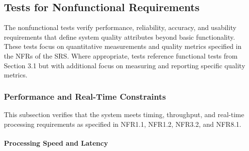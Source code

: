 \documentclass[12pt, titlepage]{article}
\begin{document}
\subsection{Tests for Nonfunctional Requirements}

The nonfunctional tests verify performance, reliability, accuracy, and
usability requirements that define system quality attributes beyond basic
functionality. These tests focus on quantitative measurements and quality
metrics specified in the NFRs of the SRS. Where appropriate, tests
reference functional tests from Section 3.1 but with additional focus on
measuring and reporting specific quality metrics.

\subsubsection{Performance and Real-Time Constraints}

This subsection verifies that the system meets timing, throughput, and real-time
processing requirements as specified in NFR1.1, NFR1.2, NFR3.2, and NFR8.1.

\paragraph{Processing Speed and Latency}
\end{document}
